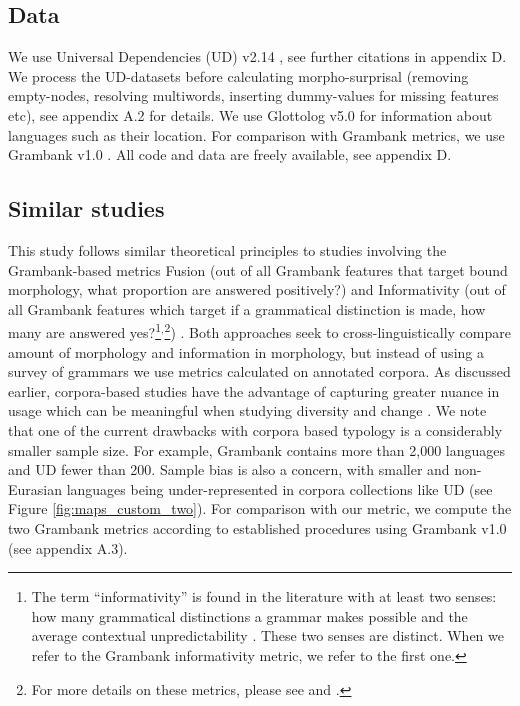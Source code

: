 \documentclass[USenglish]{article}
\begin{document}
\subsection{Data}
We use Universal Dependencies (UD) v2.14 \citep{UD_2.14}, see further citations in appendix D.
We process the UD-datasets before calculating morpho-surprisal (removing empty-nodes, resolving multiwords, inserting dummy-values for missing features etc), see appendix A.2
for details. 
We use Glottolog v5.0 \citep{hammarstrom_glottologglottolog_2024} for information about languages such as their location.
For comparison with Grambank metrics, we use Grambank v1.0 \citep{skirgard_grambank_2023-1, skirgard_grambank_2023}.
All code and data are freely available, see appendix D.
 
\subsection{Similar studies}
This study follows similar theoretical principles to studies involving the Grambank-based metrics Fusion (out of all Grambank features that target bound morphology, what proportion are answered positively?) and Informativity (out of all Grambank features which target if a grammatical distinction is made, how many are answered yes?\footnote{The term ``informativity'' is found in the literature with at least two senses: how many grammatical distinctions a grammar makes possible \citep{shcherbakova2023societies, skirgard_grambank_2023-1} and the average contextual unpredictability \citep{cohen-priva_phone_2008}. These two senses are distinct. When we refer to the Grambank informativity metric, we refer to the first one.}$^{,}$\footnote{For more details on these metrics, please see \citet{skirgard_grambank_2023-1} and \citet{skirgard_aggregate_2025}.}) \citep{shcherbakova2023societies}.
Both approaches seek to cross-linguistically compare amount of morphology and information in morphology, but instead of using a survey of grammars we use metrics calculated on annotated corpora.
As discussed earlier, corpora-based studies have the advantage of capturing greater nuance in usage which can be meaningful when studying diversity and change \citep{greenberg_quantitative_1960, bentz2016comparison, levshina_frequency_2022}. 
We note that one of the current drawbacks with corpora based typology is a considerably smaller sample size. 
For example, Grambank contains more than 2,000 languages and UD fewer than 200. 
Sample bias is also a concern, with smaller and non-Eurasian languages being under-represented in corpora collections like UD (see Figure \ref{fig:maps_custom_two}).
For comparison with our metric, we compute the two Grambank metrics according to established procedures using Grambank v1.0 (see appendix A.3).
\end{document}
